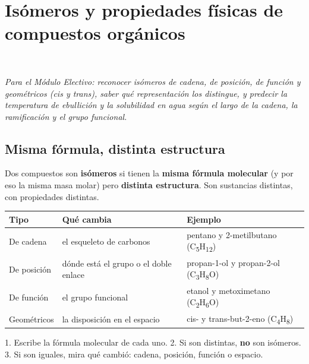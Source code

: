 \section[Isómeros y propiedades físicas de compuestos orgánicos (Mención)]{Isómeros y propiedades físicas de compuestos orgánicos}
\modmencion\ \ {\color{gris}\itshape Para el Módulo Electivo: reconocer isómeros de cadena, de posición, de función y geométricos (cis y trans), saber qué representación los distingue, y predecir la temperatura de ebullición y la solubilidad en agua según el largo de la cadena, la ramificación y el grupo funcional.\par}
\subsection{Misma fórmula, distinta estructura}
Dos compuestos son \textbf{isómeros} si tienen la \textbf{misma fórmula molecular} (y por eso la misma masa molar) pero \textbf{distinta estructura}. Son sustancias distintas, con propiedades distintas.

 
\begin{center}\small
\begin{tabularx}{\linewidth}{@{}>{\raggedright\arraybackslash\hsize=0.50\hsize}X>{\raggedright\arraybackslash\hsize=1.32\hsize}X>{\raggedright\arraybackslash\hsize=1.18\hsize}X@{}}
\toprule
\textbf{Tipo} & \textbf{Qué cambia} & \textbf{Ejemplo} \\
\midrule
De cadena & el esqueleto de carbonos & pentano y 2-metilbutano (C\textsubscript{5}H\textsubscript{12}) \\
De posición & dónde está el grupo o el doble enlace & propan-1-ol y propan-2-ol (C\textsubscript{3}H\textsubscript{8}O) \\
De función & el grupo funcional & etanol y metoximetano (C\textsubscript{2}H\textsubscript{6}O) \\
Geométricos & la disposición en el espacio & cis- y trans-but-2-eno (C\textsubscript{4}H\textsubscript{8}) \\
\bottomrule
\end{tabularx}
\end{center}
  
\begin{clave} 1. Escribe la fórmula molecular de cada uno. 2. Si son distintas, \textbf{no} son isómeros. 3. Si son iguales, mira qué cambió: cadena, posición, función o espacio.\end{clave}
 

